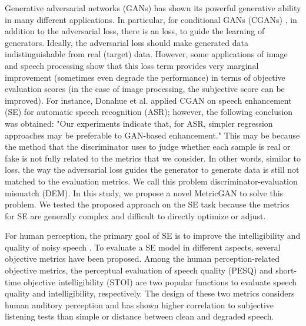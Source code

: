 \documentclass{article}
\begin{document}
Generative adversarial networks (GANs) \cite{goodfellow2014generative} has shown its powerful generative ability in many different applications. In particular, for conditional GANs (CGANs)  \cite{mirza2014conditional}, in addition to the adversarial loss, there is an  loss, to guide the learning of generators. Ideally, the adversarial loss should make generated data indistinguishable from real (target) data. However, some applications of image \cite{ledig2017photo,wang2018esrgan} and speech processing \cite{pandey2018adversarial,wang2018supervised,donahue2018exploring, michelsanti2017conditional} show that this loss term provides very marginal improvement (sometimes even degrade the performance) in terms of objective evaluation scores (in the case of image processing, the subjective score can be improved). For instance, Donahue et al.  applied CGAN on speech enhancement (SE) for automatic speech recognition (ASR); however, the following conclusion was obtained: "Our experiments indicate that, 
for ASR, simpler regression approaches may be preferable
to GAN-based enhancement." This may be because the method that the discriminator uses to judge whether each sample is real or fake is not fully related to the metrics that we consider. In other words, similar to   loss, the way the adversarial loss guides the generator to generate data is still not matched to the evaluation metrics. We call this problem discriminator-evaluation mismatch (DEM). In this study, we propose a novel MetricGAN to solve this problem. We tested the proposed approach on the SE task because the metrics for SE are generally complex and difficult to directly optimize or adjust.


For human perception, the primary goal of SE is to improve the intelligibility and quality of noisy speech \cite{benesty2015speech}. To evaluate a SE model in different aspects, several objective metrics have been proposed. Among the human perception-related objective metrics, the perceptual evaluation of speech quality (PESQ) \cite{rix2001perceptual} and short-time objective intelligibility (STOI) \cite{taal2011algorithm} are two popular functions to evaluate speech quality and intelligibility, respectively. The design of these two metrics considers human auditory perception and has shown higher correlation to subjective listening tests than simple  or  distance between clean and degraded speech. 
\end{document}
